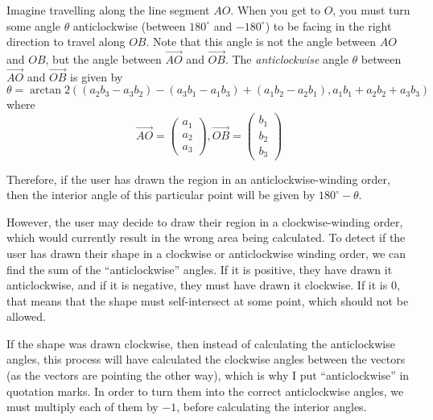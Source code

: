 \documentclass[12pt]{report}
\begin{document}
Imagine travelling along the line segment $AO$. When you get to $O$, you must turn some angle $\theta$ anticlockwise (between $180^{\circ}$ and $-180^{\circ}$) to be facing in the right direction to travel along $OB$. Note that this angle is not the angle between $AO$ and $OB$, but the angle between $\overrightarrow{AO}$ and $\overrightarrow{OB}$. The \textit{anticlockwise} angle $\theta$ between $\overrightarrow{AO}$ and $\overrightarrow{OB}$ is given by
\begin{equation}\label{eq:calcClockwiseAngle}
    \theta=\arctan 2\left(\left(a_{2}b_{3}-a_{3}b_{2}\right)-\left(a_{3}b_{1}-a_{1}b_{3}\right)+\left(a_{1}b_{2}-a_{2}b_{1}\right),a_{1}b_{1}+a_{2}b_{2}+a_{3}b_{3}\right)
\end{equation}
where
\begin{equation}
    \overrightarrow{AO}=\begin{pmatrix}a_1\\a_2\\a_3\end{pmatrix},\overrightarrow{OB}=\begin{pmatrix}b_1\\b_2\\b_3\end{pmatrix}
\end{equation}

Therefore, if the user has drawn the region in an anticlockwise-winding order, then the interior angle of this particular point will be given by $180^{\circ}-\theta$.

However, the user may decide to draw their region in a clockwise-winding order, which would currently result in the wrong area being calculated. To detect if the user has drawn their shape in a clockwise or anticlockwise winding order, we can find the sum of the ``anticlockwise'' angles. If it is positive, they have drawn it anticlockwise, and if it is negative, they must have drawn it clockwise. If it is 0, that means that the shape must self-intersect at some point, which should not be allowed.

If the shape was drawn clockwise, then instead of calculating the anticlockwise angles, this process will have calculated the clockwise angles between the vectors (as the vectors are pointing the other way), which is why I put ``anticlockwise'' in quotation marks. In order to turn them into the correct anticlockwise angles, we must multiply each of them by $-1$, before calculating the interior angles.
\end{document}
